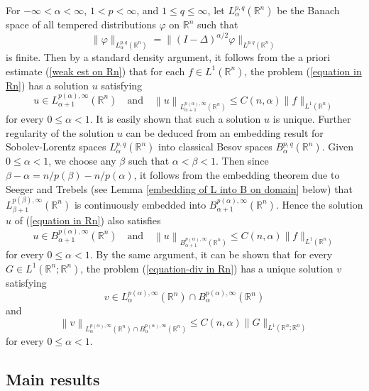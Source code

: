 \documentclass[reqno,centertags,11pt]{amsart}
\theoremstyle{definition}
\numberwithin{thm}{section}
\numberwithin{equation}{section}
\newcommand{\R}{{\mathbb{R}}}
\begin{document}
For $-\infty<\alpha<\infty$,   $1< p<\infty$, and $1 \le q \le \infty$, let  $L_\alpha^{p,q}(\R^n )$ be the Banach space of all  tempered  distributions  $\varphi$ on $\R^n $ such that
\[
\|\varphi\|_{L_\alpha^{p,q}(\R^n )} = \|(I-\Delta )^{\alpha/2} \varphi \|_{L^{p,q} (\R^n )}
\]
is finite.  Then by a standard density argument, it   follows from the a priori estimate (\ref{weak est on Rn}) that for each $f \in L^1 (\R^n )$, the problem (\ref{equation in Rn}) has a   solution $u$ satisfying
\begin{equation}\label{weak est on Rn-2}
u\in L_{\alpha+1}^{p(\alpha) ,\infty}(\R^n ) \quad\mbox{and}\quad \left\|   u \right\|_{L_{\alpha+1}^{p(\alpha) ,\infty}(\R^n )} \le C(n,\alpha ) \|f\|_{L^1 (\R^n )}
\end{equation}
for every $0 \le  \alpha < 1$.  It is easily shown that such a solution $u$ is unique. Further regularity of the solution $u$ can be deduced from an embedding result for   Sobolev-Lorentz spaces $L_\alpha^{p,q}(\R^n )$ into classical Besov spaces $B_\alpha^{p,q}(\R^n )$.
Given   $0 \le   \alpha <1$, we choose any $\beta$ such that
 $  \alpha   <  \beta  < 1$. Then since $\beta -\alpha =n/p(\beta) -n/p(\alpha)  $, it follows from the embedding theorem \cite[Theorem 1.2]{seeger}  due to  Seeger and Trebels  (see Lemma \ref{embedding of L into B on domain} below) that $L_{\beta+1}^{p(\beta),\infty}(\R^n )$ is continuously embedded into $B_{\alpha+1}^{p(\alpha) ,\infty}(\R^n )$. Hence the solution $u$ of (\ref{equation in Rn}) also satisfies
\begin{equation}\label{weak est on Rn-3}
u\in B_{\alpha+1}^{p(\alpha) ,\infty}(\R^n ) \quad\mbox{and}\quad \left\|   u \right\|_{B_{\alpha+1}^{p(\alpha) ,\infty}(\R^n )} \le C(n,\alpha ) \|f\|_{L^1 (\R^n )}
\end{equation}
for every  $0 \le  \alpha < 1$. By the same argument, it can be  shown  that
for every  $G \in L^1 (\R^n ; \R^n )$, the problem (\ref{equation-div in Rn}) has a  unique  solution $v$ satisfying
\[
v\in L_{\alpha}^{p(\alpha) ,\infty}(\R^n )\cap B_{\alpha}^{p(\alpha) ,\infty}(\R^n )
\]
and
\begin{equation}\label{weak est on Rn-div-2}
   \left\|  v \right\|_{L_{\alpha}^{p(\alpha) ,\infty}(\R^n )\cap B_{\alpha}^{p(\alpha) ,\infty}(\R^n ) } \le C(n,\alpha ) \|G\|_{L^1 (\R^n ;\R^n )}
\end{equation}
for every $0 \le  \alpha < 1$.

\subsection{Main results}
\end{document}
